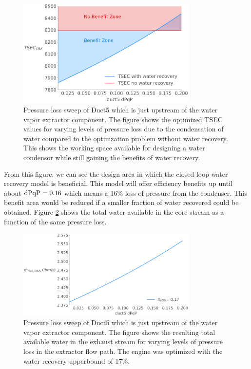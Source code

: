 \documentclass[conf]{new-aiaa}
\begin{document}
\begin{figure}[hbt!]
    \centering
    \includegraphics[width=0.8\textwidth]{N3_dpqp.pdf}
    \caption{Pressure loss sweep of Duct5 which is just upstream of the water vapor extractor component.
        The figure shows the optimized TSEC values for varying levels of pressure loss due to the condensation of water compared to the optimzation problem without water recovery.
        This shows the working space available for designing a water condensor while still gaining the benefits of water recovery.}
    \label{fig:dpqp_sweep}
\end{figure}

From this figure, we can see the design area in which the closed-loop water recovery model is beneficial.
This model will offer efficiency benefits up until about $\rm{dPqP} = 0.16$ which means a 16\% loss of pressure from the condenser.
This benefit area would be reduced if a smaller fraction of water recovered could be obtained.
Figure \ref{fig:dpqp_wdot} shows the total water available in the core stream as a function of the same pressure loss.

\begin{figure}[hbt!]
    \centering
    \includegraphics[width=0.8\textwidth]{N3_wdot.pdf}
    \caption{Pressure loss sweep of Duct5 which is just upstream of the water vapor extractor component.
        The figure shows the resulting total available water in the exhaust stream for varying levels of pressure loss in the extractor flow path.
        The engine was optimized with the water recovery upperbound of 17\%.
    }
    \label{fig:dpqp_wdot}
\end{figure}
\end{document}
